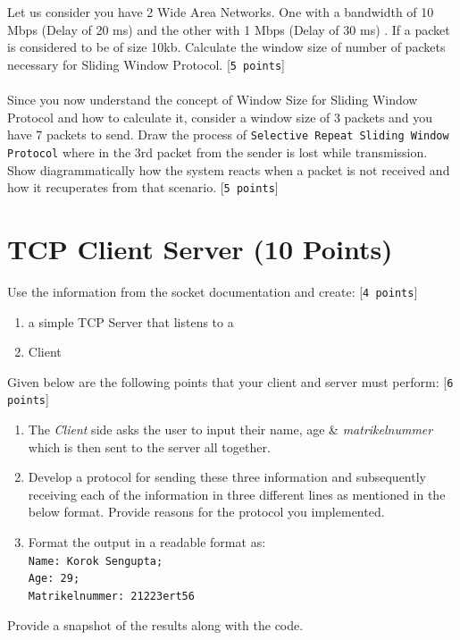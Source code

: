 \documentclass{scrartcl}
\begin{document}
Let us consider you have 2 Wide Area Networks. One with a bandwidth of 10 Mbps (Delay of 20 ms) and the other with 1 Mbps (Delay of 30 ms) . If a packet is considered to be of size 10kb. Calculate the window size of number of packets necessary for Sliding Window Protocol. [\texttt{5 points}]\\ \\
Since you now understand the concept of Window Size for Sliding Window Protocol and how to calculate it, consider a window size of 3 packets and you have 7 packets to send. Draw the process of \texttt{Selective Repeat Sliding Window Protocol} where in the 3rd packet from the sender is lost while transmission. Show diagrammatically how the system reacts when a packet is not received and how it recuperates from that scenario. [\texttt{5 points}] \\





\section{TCP Client Server (10 Points)}

Use the information from the socket documentation and create: [\texttt{4 points}]
\begin{enumerate}
\item a simple TCP Server that listens to a
\item Client
\end{enumerate}
Given below are the following points that your client and server must perform: [\texttt{6 points}]
\begin{enumerate}
\item The \emph{Client} side asks the user to input their name, age \& \emph{matrikelnummer} which is then sent to the server all together.
\item Develop a protocol for sending these three information and subsequently receiving each of the information in three different lines as mentioned in the below format. Provide reasons for the protocol you implemented. 
\item Format the output in a readable format as:\texttt{\\ Name: Korok Sengupta; \\ Age: 29; \\ Matrikelnummer: 21223ert56}
\end{enumerate}

Provide a snapshot of the results along with the code. \\
\end{document}
